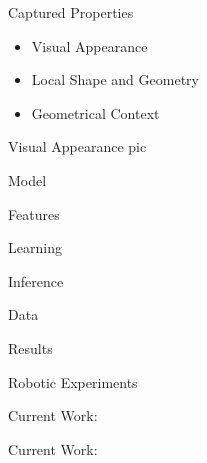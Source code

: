 \documentclass{beamer}
\begin{document}
\begin{frame}{Captured Properties}
	\begin{itemize}
		\item Visual Appearance
		\item  Local Shape and Geometry
		\item  Geometrical Context
	\end{itemize}

\end{frame}

\begin{frame}{Visual Appearance}
pic
\end{frame}

\begin{frame}{Model}

\end{frame}

\begin{frame}{Features}

\end{frame}

\begin{frame}{Learning}

\end{frame}

\begin{frame}{Inference}
 
 
\end{frame}

\begin{frame}{Data}

\end{frame}


\begin{frame}{Results }
\end{frame}

\begin{frame}{Robotic Experiments}
\end{frame}

\begin{frame}{Current Work: }
\end{frame}

\begin{frame}{Current Work: }
\end{frame}
\end{document}
